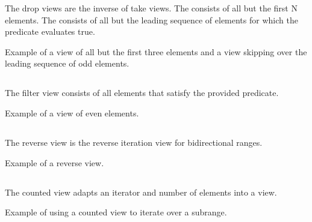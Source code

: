 The drop views are the inverse of take views.
The  consists of all but the first N elements.
The  consists of all but the leading sequence of elements for which the predicate evaluates true.

\begin{box-note}
\footnotesize Example of a view of all but the first three elements and a view skipping over the leading sequence of odd elements.
\tcblower
{}
\end{box-note}

\subsection{\texorpdfstring{}{\texttt{std::views::filter}}}

The filter view consists of all elements that satisfy the provided predicate.

\begin{box-note}
\footnotesize Example of a view of even elements.
\tcblower
{}
\end{box-note}

\subsection{\texorpdfstring{}{\texttt{std::views::reverse}}}

The reverse view is the reverse iteration view for bidirectional ranges.

\begin{box-note}
\footnotesize Example of a reverse view.
\tcblower
{}
\end{box-note}

\subsection{\texorpdfstring{}{\texttt{std::views::counted}}}

The counted view adapts an iterator and number of elements into a view.

\begin{box-note}
\footnotesize Example of using a counted view to iterate over a subrange.
\tcblower
{}
\end{box-note}

